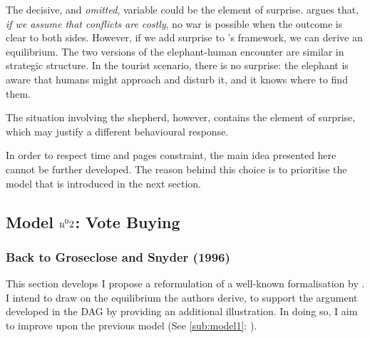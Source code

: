\vspace*{1em}
The decisive, and \textit{omitted}, variable could be the element of surprise.
\textcite{Fearon_1995} argues that, \textit{if we assume that conflicts are costly}, no war is possible when the outcome is clear to both sides. However, if we add surprise to \textcite{Fearon_1995}'s framework, we can derive an equilibrium.
The two versions of the elephant-human encounter are similar in strategic structure. In the tourist scenario, there is no surprise: the elephant is aware that humans might approach and disturb it, and it knows where to find them.

The situation involving the shepherd, however, contains the element of surprise, which may justify a different behavioural response.

\vspace*{1em}
In order to respect time and pages constraint, the main idea presented here cannot be further developed. The reason behind this choice is to prioritise the model that is introduced in the next section.


\subsection{Model \(\text{n}^{{\small{0}}}2\): Vote Buying}

\subsubsection{Back to Groseclose and Snyder (1996)}
This section develops I propose a reformulation of a well-known formalisation by \textcite{grosecloseBuyingSupermajorities1996}. I intend to draw on the equilibrium the authors derive, to support the argument developed in the DAG by providing an additional illustration. In doing so, I aim to improve upon the previous model (See \autoref{sub:model1}: ).

